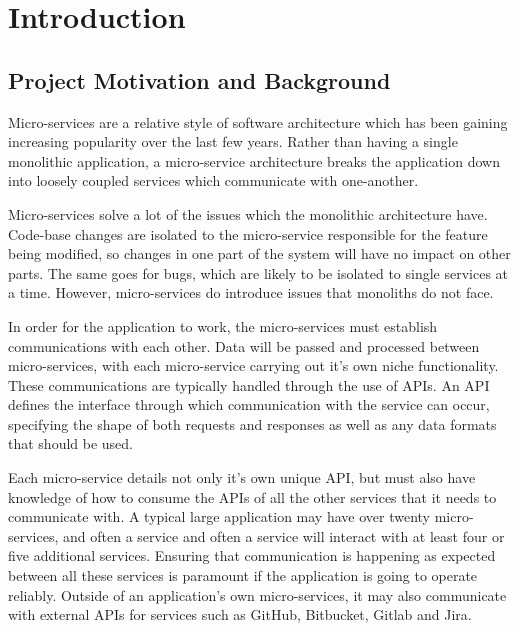 \chapter{Introduction}
\section{Project Motivation and Background}

Micro-services are a relative style of software architecture which has been gaining increasing popularity over the last few years. Rather than having a single monolithic application, a micro-service architecture breaks the application down into loosely coupled services which communicate with one-another. 

Micro-services solve a lot of the issues which the monolithic architecture have. Code-base changes are isolated to the micro-service responsible for the feature being modified, so changes in one part of the system will have no impact on other parts. The same goes for bugs, which are likely to be isolated to single services at a time. However, micro-services do introduce issues that monoliths do not face.

In order for the application to work, the micro-services must establish communications with each other. Data will be passed and processed between micro-services, with each micro-service carrying out it's own niche functionality. These communications are typically handled through the use of APIs. An API defines the interface through which communication with the service can occur, specifying the shape of both requests and responses as well as any data formats that should be used.

Each micro-service details not only it's own unique API, but must also have knowledge of how to consume the APIs of all the other services that it needs to communicate with. A typical large application may have over twenty micro-services, and often a service and often a service will interact with at least four or five additional services. Ensuring that communication is happening as expected between all these services is paramount if the application is going to operate reliably. Outside of an application’s own micro-services, it may also communicate with external APIs for services such as GitHub, Bitbucket, Gitlab and Jira.

